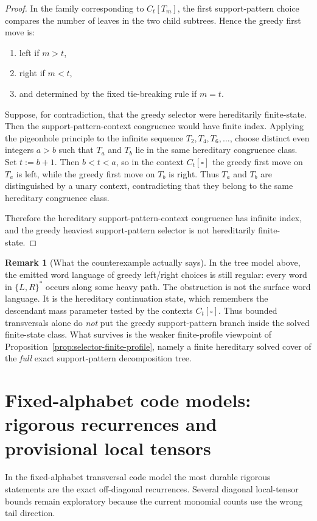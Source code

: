 \documentclass[11pt]{article}
\theoremstyle{definition}
\newtheorem{remark}[theorem]{Remark}
\newcommand{\1}{\mathbf{1}}
\begin{document}
\begin{proof}
In the family corresponding to $C_t[T_m]$, the first support-pattern choice compares the number of leaves in the two child subtrees.
Hence the greedy first move is:
\begin{enumerate}[label=(\alph*),leftmargin=2.2em]
\item left if $m>t$,
\item right if $m<t$,
\item and determined by the fixed tie-breaking rule if $m=t$.
\end{enumerate}

Suppose, for contradiction, that the greedy selector were hereditarily finite-state.
Then the support-pattern-context congruence would have finite index.
Applying the pigeonhole principle to the infinite sequence $T_2,T_4,T_6,\dots$, choose distinct even integers $a>b$ such that $T_a$ and $T_b$ lie in the same hereditary congruence class.
Set $t:=b+1$.
Then $b<t<a$, so in the context $C_t[\square]$ the greedy first move on $T_a$ is left, while the greedy first move on $T_b$ is right.
Thus $T_a$ and $T_b$ are distinguished by a unary context, contradicting that they belong to the same hereditary congruence class.

Therefore the hereditary support-pattern-context congruence has infinite index, and the greedy heaviest support-pattern selector is not hereditarily finite-state.
\end{proof}

\begin{remark}[What the counterexample actually says]\label{rem:greedy-support-selector}
In the tree model above, the emitted word language of greedy left/right choices is still regular: every word in $\{L,R\}^\ast$ occurs along some heavy path.
The obstruction is not the surface word language.
It is the hereditary continuation state, which remembers the descendant mass parameter tested by the contexts $C_t[\square]$.
Thus bounded transversals alone do \emph{not} put the greedy support-pattern branch inside the solved finite-state class.
What survives is the weaker finite-profile viewpoint of Proposition~\ref{prop:selector-finite-profile}, namely a finite hereditary solved cover of the \emph{full} exact support-pattern decomposition tree.
\end{remark}

\section{Fixed-alphabet code models: rigorous recurrences and provisional local tensors}\label{sec:fixed-alphabet}
In the fixed-alphabet transversal code model the most durable rigorous statements are the exact off-diagonal recurrences. Several diagonal local-tensor bounds remain exploratory because the current monomial counts use the wrong tail direction.
\end{document}
